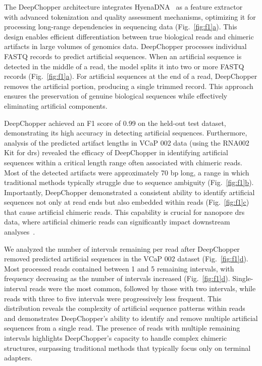 \documentclass[pdflatex,sn-nature, lineno]{sn-jnl}%
\newcommand{\figref}[2]{Fig.~\hyperref[#1]{\ref*{#1}#2}}
\theoremstyle{thmstyleone}%
\theoremstyle{thmstyletwo}%
\theoremstyle{thmstylethree}%
\begin{document}
The DeepChopper architecture integrates HyenaDNA~\cite{nguyen2024hyenadna} as a feature extractor with advanced tokenization and quality assessment mechanisms, optimizing it for processing long-range dependencies in sequencing data (\figref{fig:f1}{a}).
This design enables efficient differentiation between true biological reads and chimeric artifacts in large volumes of genomics data.
DeepChopper processes individual FASTQ records to predict artificial sequences.
When an artificial sequence is detected in the middle of a read, the model splits it into two or more FASTQ records (\figref{fig:f1}{a}).
For artificial sequences at the end of a read, DeepChopper removes the artificial portion, producing a single trimmed record.
This approach ensures the preservation of genuine biological sequences while effectively eliminating artificial components.

DeepChopper achieved an F1 score of 0.99 on the held-out test dataset, demonstrating its high accuracy in detecting artificial sequences.
Furthermore, analysis of the predicted artifact lengths in VCaP 002 data (using the RNA002 Kit for \gls{drs}) revealed the efficacy of DeepChopper in identifying artificial sequences within a critical length range often associated with chimeric reads.
Most of the detected artifacts were approximately 70 bp long, a range in which traditional methods typically struggle due to sequence ambiguity (\figref{fig:f1}{b}).
Importantly, DeepChopper demonstrated a consistent ability to identify artificial sequences not only at read ends but also embedded within reads (\figref{fig:f1}{c}) that cause artificial chimeric reads.
This capability is crucial for nanopore \gls{drs} data, where artificial chimeric reads can significantly impact downstream analyses~\cite{smith2020molecular}.

We analyzed the number of intervals remaining per read after DeepChopper removed predicted artificial sequences in the VCaP 002 dataset (\figref{fig:f1}{d}). 
Most processed reads contained between 1 and 5 remaining intervals, with frequency decreasing as the number of intervals increased (\figref{fig:f1}{d}). 
Single-interval reads were the most common, followed by those with two intervals, while reads with three to five intervals were progressively less frequent.
This distribution reveals the complexity of artificial sequence patterns within reads and demonstrates DeepChopper's ability to identify and remove multiple artificial sequences from a single read. 
The presence of reads with multiple remaining intervals highlights DeepChopper's capacity to handle complex chimeric structures, surpassing traditional methods that typically focus only on terminal adapters.
\end{document}
